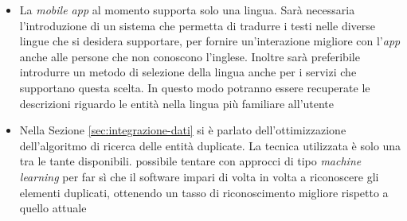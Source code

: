 \begin{itemize}
	\item
	La \emph{mobile app} al momento supporta solo una lingua. Sarà necessaria l'in\-tro\-du\-zio\-ne di un sistema che permetta di tradurre i testi nelle diverse lingue che si desidera supportare, per fornire un'interazione migliore con l'\emph{app} anche alle persone che non conoscono l'inglese. Inoltre sarà preferibile introdurre un metodo di selezione della lingua anche per i servizi che supportano questa scelta. In questo modo potranno essere recuperate le descrizioni riguardo le entità nella lingua più familiare all'utente
	\item
	Nella Sezione \ref{sec:integrazione-dati} si è parlato dell'ottimizzazione dell'algoritmo di ricerca delle entità duplicate. La tecnica utilizzata è solo una tra le tante disponibili. \upe possibile tentare con approcci di tipo \emph{machine learning} per far sì che il software impari di volta in volta a riconoscere gli elementi duplicati, ottenendo un tasso di riconoscimento migliore rispetto a quello attuale
\end{itemize}